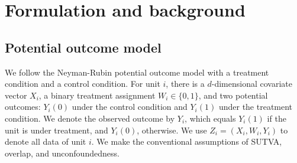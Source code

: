 \documentclass[twoside]{article}
\newtheorem{assumption}{Assumption}
\newcommand{\1}{{\mathbbm{1}}}
\begin{document}
\section{Formulation and background}\label{sec:background}

\subsection{Potential outcome model}\label{sec:potential.outcome.model}

We follow the Neyman-Rubin potential outcome model \parencite{rubin1974estimating} with a treatment condition and a control condition.
For unit $i$, there is a $d$-dimensional covariate vector $X_i$, a binary treatment assignment $W_i \in \{0, 1\}$, and two potential outcomes: $Y_i(0)$ under the control condition and $Y_i(1)$ under the treatment condition.
We denote the observed outcome by $Y_i$, which equals $Y_i(1)$ if the unit is under treatment, and $Y_i(0)$, otherwise.
We use $Z_i = (X_i, W_i, Y_i)$ to denote all data of unit $i$.
We make the conventional assumptions of SUTVA, overlap, and unconfoundedness.


\end{document}
